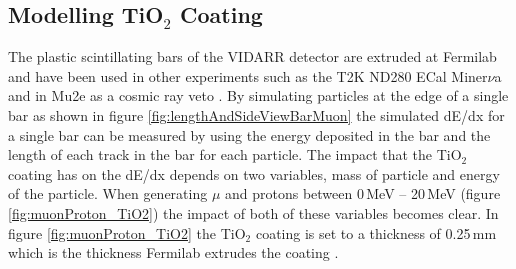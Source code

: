 \begin{figure}[!h]
\begin{minipage}{.45\textwidth}
  \label{fig:individualDarkNoiseOld}
\end{minipage}
\end{figure}

\subsection{Modelling TiO$_2$ Coating}
The plastic scintillating bars of the VIDARR detector are extruded at Fermilab and have been used in other experiments such as the T2K ND280 ECal \cite{Allan_2013} Miner$\nu$a \cite{aliaga2014design} and in Mu2e as a cosmic ray veto \cite{Pla-Dalmau2014}. By simulating particles at the edge of a single bar as shown in figure \ref{fig:lengthAndSideViewBarMuon} the simulated dE/dx for a single bar can be measured by using the energy deposited in the bar and the length of each track in the bar for each particle. The impact that the TiO$_2$ coating has on the dE/dx depends on two variables, mass of particle and energy of the particle. When generating $\mu$ and protons between 0\,MeV -- 20\,MeV (figure \ref{fig:muonProton_TiO2}) the impact of both of these variables becomes clear. In figure \ref{fig:muonProton_TiO2} the TiO$_2$ coating is set to a thickness of 0.25\,mm which is the thickness Fermilab extrudes the coating \cite{Pla-Dalmau2014}.


